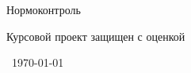 \begin{titlepage}
\vspace{0.4cm}

\noindent
Нормоконтроль \hspace{6.1cm}  \hspace{0.2cm}  

\vspace{0.4cm}
\noindent
Курсовой проект защищен с оценкой \uline{\hfill}

\vfill

\begin{center}
	\city \
	\onlyyear\today
\end{center}
\makeatother
\end{titlepage}